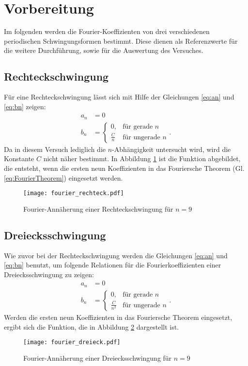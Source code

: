 \section{Vorbereitung}
Im folgenden werden die Fourier-Koeffizienten von drei verschiedenen periodischen Schwingungsformen bestimmt. Diese dienen als Referenzwerte für die weitere Durchführung, sowie für die Auswertung des Versuches.
\subsection{Rechteckschwingung}
Für eine Rechteckschwingung lässt sich mit Hilfe der Gleichungen \eqref{eq:an} und \eqref{eq:bn} zeigen:
\begin{align*}
    a_n &= 0 \\
    b_n &= 
    \begin{cases}
    0 ,     & \text {für gerade $n$} \\
    \frac{C}{n} & \text {für ungerade $n$}
    \end{cases} .
\end{align*}
Da in diesem Versuch lediglich die $n$-Abhängigkeit untersucht wird, wird die Konstante $C$ nicht näher bestimmt. In Abbildung \ref{fig:vorbereitung_rechteck} ist die Funktion abgebildet, die entsteht, wenn die ersten neun Koeffizienten in das Fouriersche Theorem (Gl. \eqref{eq:FourierTheorem}) eingesetzt werden.
\begin{figure}[h]
  \centering
  \texttt{[image: fourier\_rechteck.pdf]}
  \caption{Fourier-Annäherung einer Rechteckschwingung für $n=9$}
  \label{fig:vorbereitung_rechteck}
\end{figure}
\subsection{Dreiecksschwingung}
Wie zuvor bei der Rechteckschwingung werden die Gleichungen \eqref{eq:an} und \eqref{eq:bn} benutzt, um folgende Relationen für die Fourierkoeffizienten einer Dreiecksschwingung zu zeigen:
\begin{align*}
    a_n &= 0 \\
    b_n &= 
    \begin{cases}
    0 ,     & \text {für gerade $n$} \\
    \frac{C}{n^2} & \text {für ungerade $n$}
    \end{cases} .
\end{align*}
Werden die ersten neun Koeffizienten in das Fouriersche Theorem eingesetzt, ergibt sich die Funktion, die in Abbildung \ref{fig:vorbereitung_dreieck} dargestellt ist.
\begin{figure}[h]
  \centering
  \texttt{[image: fourier\_dreieck.pdf]}
  \caption{Fourier-Annäherung einer Dreiecksschwingung für $n=9$}
  \label{fig:vorbereitung_dreieck}
\end{figure}
